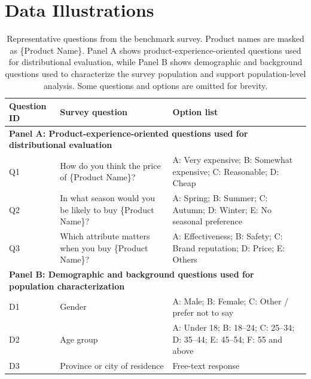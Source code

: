 \documentclass{article}
\begin{document}



\newpage

\appendix

\section{Data Illustrations}
\label{app:tables}

\begin{table}[htb!]
\centering
\small
\begin{tabular}{p{}p{}p{}}
\toprule
Question ID & Survey question & Option list \\
\midrule
\multicolumn{3}{l}{\textbf{Panel A: Product-experience-oriented questions used for distributional evaluation}} \\
\midrule
Q1 &
How do you think the price of \{Product Name\}? &
A: Very expensive; B: Somewhat expensive; C: Reasonable; D: Cheap \\

Q2 &
In what season would you be likely to buy \{Product Name\}? &
A: Spring; B: Summer; C: Autumn; D: Winter; E: No seasonal preference \\

Q3 &
Which attribute matters when you buy \{Product Name\}? &
A: Effectiveness; B: Safety; C: Brand reputation; D: Price; E: Others \\

\midrule
\multicolumn{3}{l}{\textbf{Panel B: Demographic and background questions used for population characterization}} \\
\midrule
D1 &
Gender &
A: Male; B: Female; C: Other / prefer not to say \\

D2 &
Age group &
A: Under 18; B: 18--24; C: 25--34; D: 35--44; E: 45--54; F: 55 and above \\

D3 &
Province or city of residence &
Free-text response \\

\bottomrule
\end{tabular}
\caption{Representative questions from the benchmark survey. Product names are masked as \{Product Name\}. Panel A shows product-experience-oriented questions used for distributional evaluation, while Panel B shows demographic and background questions used to characterize the survey population and support population-level analysis. Some questions and options are omitted for brevity.}
\label{tab:questions}
\end{table}
\end{document}
